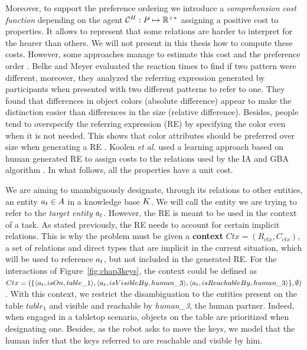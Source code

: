 \documentclass[a4paper,11pt,twoside]{StyleThese}
\begin{document}
Moreover, to support the preference ordering we introduce a \textit{comprehension cost function} depending on the agent $\mathcal{C}^H: P \mapsto \mathbb{R}^{+*}$ assigning a positive cost to properties. It allows to represent that some relations are harder to interpret for the hearer than others. We will not present in this thesis how to compute these costs. However, some approaches manage to estimate this cost and the preference order \cite{belke2002tracking, koolen2012learning}. Belke and Meyer evaluated the reaction times to find if two pattern were different, moreover, they analyzed the referring expression generated by participants when presented with two different patterns to refer to one. They found that differences in object colors (absolute difference) appear to make the distinction easier than differences in the size (relative difference). Besides, people tend to overspecify the referring expression (RE) by specifying the color even when it is not needed. This shows that color attributes should be preferred over size when generating a RE \cite{belke2002tracking}. Koolen \textit{et al.} used a learning approach based on human generated RE to assign costs to the relations used by the IA and GBA algorithm \cite{koolen2012learning}. In what follows, all the properties have a unit cost.

We are aiming to unambiguously designate, through its relations to other entities, an entity $a_t \in A$ in a knowledge base $K$. We will call the entity we are trying to refer to the \textit{target entity} $a_t$.
However, the RE is meant to be used in the context of a task. As stated previously, the RE needs to account for certain implicit relations. This is why the problem must be given a \textbf{context} $Ctx = (R_{ctx}, C_{ctx})$, a set of relations and direct types that are implicit in the current situation, which will be used to reference $a_t$, but not included in the generated RE. For the interactions of Figure~\ref{fig:chap3keys}, the context could be defined as $Ctx = (\{ \langle a_t, isOn, table\_1 \rangle, \langle a_t, isVisibleBy, human\_3 \rangle, \langle a_t, isReachableBy, human\_3 \rangle \}, \emptyset)$. With this context, we restrict the disambiguation to the entities present on the table $table_1$ and visible and reachable by \textit{human\_3}, the human partner. Indeed, when engaged in a tabletop scenario, objects on the table are prioritized when designating one. Besides, as the robot asks to move the keys, we model that the human infer that the keys referred to are reachable and visible by him.
\end{document}
